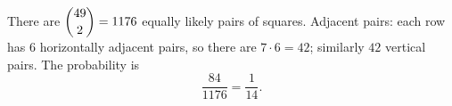 There are $\dbinom{49}{2}=1176$ equally likely pairs of squares. Adjacent pairs: each row has $6$ horizontally adjacent pairs, so there are $7\cdot6=42$; similarly $42$ vertical pairs. The probability is
\[
\dfrac{84}{1176}=\boxed{\dfrac{1}{14}}.
\]

